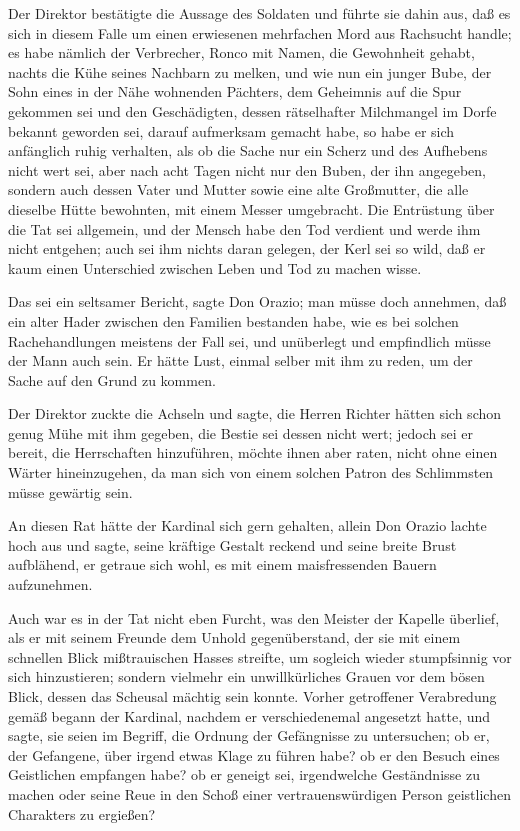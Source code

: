 Der Direktor bestätigte die Aussage des Soldaten und führte sie
dahin aus, daß es sich in diesem Falle um einen erwiesenen
mehrfachen Mord aus Rachsucht handle; es habe nämlich der
Verbrecher, Ronco mit Namen, die Gewohnheit gehabt, nachts die Kühe
seines Nachbarn zu melken, und wie nun ein junger Bube, der Sohn
eines in der Nähe wohnenden Pächters, dem Geheimnis auf die Spur
gekommen sei und den Geschädigten, dessen rätselhafter Milchmangel
im Dorfe bekannt geworden sei, darauf aufmerksam gemacht habe, so
habe er sich anfänglich ruhig verhalten, als ob die Sache nur ein
Scherz und des Aufhebens nicht wert sei, aber nach acht Tagen nicht
nur den Buben, der ihn angegeben, sondern auch dessen Vater und
Mutter sowie eine alte Großmutter, die alle dieselbe Hütte
bewohnten, mit einem Messer umgebracht. Die Entrüstung über die Tat
sei allgemein, und der Mensch habe den Tod verdient und werde ihm
nicht entgehen; auch sei ihm nichts daran gelegen, der Kerl sei so
wild, daß er kaum einen Unterschied zwischen Leben und Tod zu
machen wisse.

\pagenum{[68]} Das sei ein seltsamer Bericht, sagte Don Orazio; man
müsse doch annehmen, daß ein alter Hader zwischen den Familien
bestanden habe, wie es bei solchen Rachehandlungen meistens der
Fall sei, und unüberlegt und empfindlich müsse der Mann auch sein.
Er hätte Lust, einmal selber mit ihm zu reden, um der Sache auf den
Grund zu kommen.

Der Direktor zuckte die Achseln und sagte, die Herren Richter
hätten sich schon genug Mühe mit ihm gegeben, die Bestie sei dessen
nicht wert; jedoch sei er bereit, die Herrschaften hinzuführen,
möchte ihnen aber raten, nicht ohne einen Wärter hineinzugehen, da
man sich von einem solchen Patron des Schlimmsten müsse gewärtig
sein.

An diesen Rat hätte der Kardinal sich gern gehalten, allein Don
Orazio lachte hoch aus und sagte, seine kräftige Gestalt reckend
und seine breite Brust aufblähend, er getraue sich wohl, es mit
einem maisfressenden Bauern aufzunehmen.

Auch war es in der Tat nicht eben Furcht, was den Meister der
Kapelle überlief, als er mit seinem Freunde dem Unhold
gegenüberstand, der sie mit einem schnellen Blick mißtrauischen
Hasses streifte, um sogleich wieder stumpfsinnig vor sich
hinzustieren; sondern vielmehr ein unwillkürliches Grauen vor dem
bösen Blick, dessen das Scheusal mächtig sein konnte. Vorher
getroffener Verabredung gemäß begann der Kardinal, nachdem er
verschiedenemal angesetzt hatte, und sagte, sie seien im Begriff,
die Ordnung der Gefängnisse zu untersuchen; ob er, der Gefangene,
über irgend etwas Klage zu führen habe? ob er den Besuch eines
Geistlichen empfangen habe? ob er geneigt sei, irgendwelche
Geständnisse zu machen oder seine Reue in den Schoß einer
vertrauenswürdigen Person geistlichen Charakters zu ergießen?

